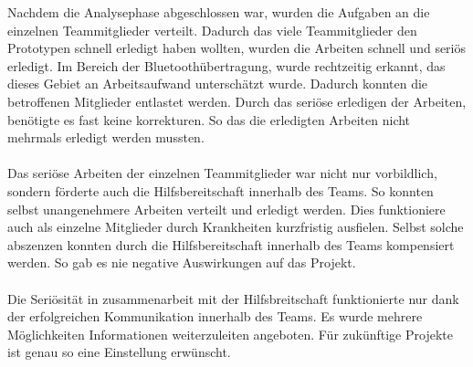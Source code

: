 Nachdem die Analysephase abgeschlossen war, wurden die Aufgaben an die einzelnen Teammitglieder verteilt. 
Dadurch das viele Teammitglieder den Prototypen schnell erledigt haben wollten, wurden die Arbeiten schnell und seriös erledigt. Im Bereich der Bluetoothübertragung, wurde rechtzeitig erkannt, das dieses Gebiet an Arbeitsaufwand unterschätzt wurde. Dadurch konnten die betroffenen Mitglieder entlastet werden. Durch das seriöse erledigen der Arbeiten, benötigte es fast keine korrekturen. So das die erledigten Arbeiten nicht mehrmals erledigt werden mussten.\\
\\
Das seriöse Arbeiten der einzelnen Teammitglieder war nicht nur vorbildlich, sondern förderte auch die Hilfsbereitschaft innerhalb des Teams. So konnten selbst unangenehmere Arbeiten verteilt und erledigt werden. Dies funktioniere auch als einzelne Mitglieder durch Krankheiten kurzfristig ausfielen. Selbst solche abszenzen konnten durch die Hilfsbereitschaft innerhalb des Teams kompensiert werden. So gab es nie negative Auswirkungen auf das Projekt.\\
\\
Die Seriösität in zusammenarbeit mit der Hilfsbreitschaft funktionierte nur dank der erfolgreichen Kommunikation innerhalb des Teams. Es wurde mehrere Möglichkeiten Informationen weiterzuleiten angeboten. Für zukünftige Projekte ist genau so eine Einstellung erwünscht. 

